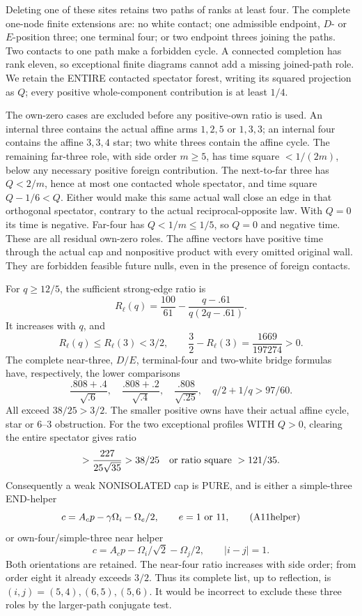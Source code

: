 \documentclass[11pt]{article}
\begin{document}
Deleting one of these sites retains two paths
of ranks at least four.
The complete one-node finite extensions are:
no white contact; one admissible endpoint,
\(D\)- or \(E\)-position three; one terminal
four; or two endpoint threes joining the paths.
Two contacts to one path make a forbidden
cycle.  A connected completion has rank eleven,
so exceptional finite diagrams cannot add a
missing joined-path role.
We retain the ENTIRE contacted spectator forest,
writing its squared projection as \(Q\);
every positive whole-component contribution
is at least \(1/4\).

The own-zero cases are excluded before any
positive-own ratio is used.
An internal three contains the actual affine
arms \(1,2,5\) or \(1,3,3\); an internal four
contains the affine \(3,3,4\) star; two
white threes contain the affine cycle.
The remaining far-three role, with side
order \(m\ge5\), has time square
\(<1/(2m)\), below any necessary positive
foreign contribution.
The next-to-far three has \(Q<2/m\), hence
at most one contacted whole spectator, and
time square \(Q-1/6<Q\).
Either would make this same actual wall
close an edge in that orthogonal spectator,
contrary to the actual reciprocal-opposite
law.  With \(Q=0\) its time is negative.
Far-four has \(Q<1/m\le1/5\), so \(Q=0\)
and negative time.
These are all residual own-zero roles.
The affine vectors have positive time through
the actual cap and nonpositive product with
every omitted original wall.
They are forbidden feasible future nulls,
even in the presence of foreign contacts.

For \(q\ge12/5\), the sufficient strong-edge
ratio is
\[
 R_\ell(q)={\frac{100}{61}}
              -{\frac{q-.61}{q(2q-.61)}}.
\]
It increases with \(q\), and
\[
 R_\ell(q)\le R_\ell(3)<3/2,\qquad
 {\frac{3}{2}}-R_\ell(3)={\frac{1669}{197274}}>0.
\]
The complete near-three, \(D/E\), terminal-four
and two-white bridge formulas have, respectively,
the lower comparisons
\[
 {\frac{.808+.4}{\sqrt{.6}}},\quad
 {\frac{.808+.2}{\sqrt{.4}}},\quad
 {\frac{.808}{\sqrt{.25}}},\quad
 q/2+1/q>97/60 .
\]
All exceed \(38/25>3/2\).
The smaller positive owns have their actual
affine cycle, star or \(6\)--\(3\) obstruction.
For the two exceptional profiles WITH \(Q>0\),
clearing the entire spectator gives ratio
\[
 >{\frac{227}{25\sqrt{35}}}>38/25
       \quad\hbox{or ratio square }>121/35.
\]
Consequently a weak NONISOLATED cap is PURE,
and is either a simple-three END-helper
\[
 c=A_cp-\gamma\Omega_i-\Omega_e/2,\qquad
 e=1\ \hbox{or }11,
\tag{A11helper}\label{eq:arithA11helper}
\]
or own-four/simple-three near helper
\[
 c=A_cp-\Omega_i/\sqrt2-\Omega_j/2,\qquad |i-j|=1.
\tag{A11near4}\label{eq:arithA11near4}
\]
Both orientations are retained.
The near-four ratio increases with side order;
from order eight it already exceeds \(3/2\).
Thus its complete list, up to reflection, is
\((i,j)=(5,4),(6,5),(5,6)\).
It would be incorrect to exclude these three
roles by the larger-path conjugate test.
\end{document}
